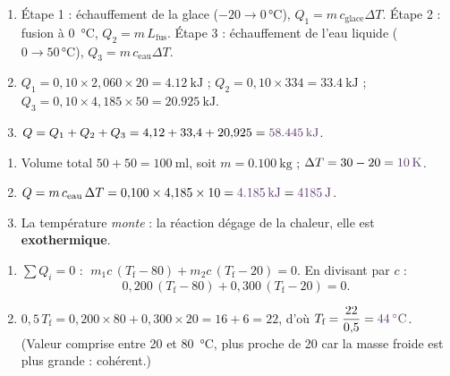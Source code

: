 \documentclass[11pt,a4paper]{article}
\newcommand{\rep}[1]{\textcolor{primarydark}{\textbf{#1}}}
\begin{document}
\begin{center}
\end{center}

\begin{correction}
\begin{enumerate}[label=\alph*),leftmargin=2em,topsep=2pt,itemsep=2pt]
  \item Étape 1 : échauffement de la glace ($-20\to0\,\si{\celsius}$), $Q_1=m\,c_{\text{glace}}\Delta T$.
        Étape 2 : fusion à \SI{0}{\celsius}, $Q_2=m\,L_{\text{fus}}$. Étape 3 : échauffement de l'eau
        liquide ($0\to50\,\si{\celsius}$), $Q_3=m\,c_{\text{eau}}\Delta T$.
  \item $Q_1 = 0{,}10\times2{,}060\times20 = \SI{4.12}{\kilo\joule}$ ;\quad
        $Q_2 = 0{,}10\times334 = \SI{33.4}{\kilo\joule}$ ;\quad
        $Q_3 = 0{,}10\times4{,}185\times50 = \SI{20.925}{\kilo\joule}$.
  \item $Q = Q_1+Q_2+Q_3 = 4{,}12+33{,}4+20{,}925 = \rep{\SI{58.445}{\kilo\joule}}$.
\end{enumerate}
\end{correction}

\begin{correction}
\begin{enumerate}[label=\alph*),leftmargin=2em,topsep=2pt,itemsep=2pt]
  \item Volume total $50+50=\SI{100}{\milli\litre}$, soit $m=\SI{0.100}{\kilogram}$ ;
        $\Delta T = 30-20 = \rep{\SI{10}{\kelvin}}$.
  \item $Q = m\,c_{\text{eau}}\,\Delta T = 0{,}100\times4{,}185\times10 = \rep{\SI{4.185}{\kilo\joule}} = \rep{\SI{4185}{\joule}}$.
  \item La température \emph{monte} : la réaction dégage de la chaleur, elle est \rep{exothermique}.
\end{enumerate}
\end{correction}

\begin{correction}
\begin{enumerate}[label=\alph*),leftmargin=2em,topsep=2pt,itemsep=2pt]
  \item $\sum Q_i = 0$ : $\;m_1 c\,(T_{\text{f}}-80) + m_2 c\,(T_{\text{f}}-20) = 0$. En divisant par $c$ :
        \[ 0{,}200\,(T_{\text{f}}-80) + 0{,}300\,(T_{\text{f}}-20) = 0. \]
  \item $0{,}5\,T_{\text{f}} = 0{,}200\times80 + 0{,}300\times20 = 16 + 6 = 22$, d'où
        $T_{\text{f}} = \dfrac{22}{0{,}5} = \rep{\SI{44}{\celsius}}$. (Valeur comprise entre \SI{20}{} et
        \SI{80}{\celsius}, plus proche de \SI{20}{} car la masse froide est plus grande : cohérent.)
\end{enumerate}
\end{correction}
\end{document}
